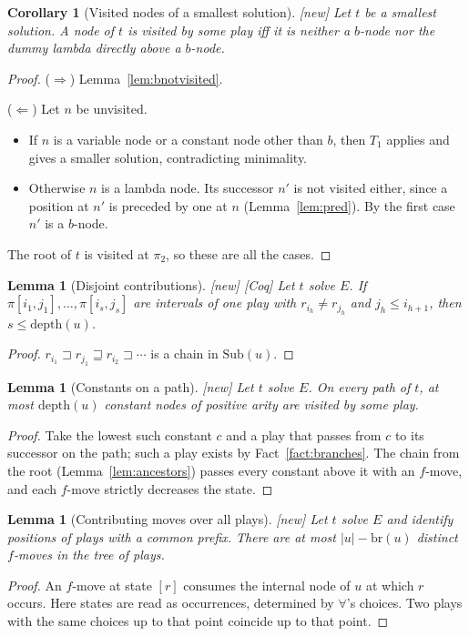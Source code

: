 \documentclass[11pt]{article}
\newcommand{\Sub}{\mathrm{Sub}}
\newcommand{\depth}{\mathrm{depth}}
\newcommand{\br}{\mathrm{br}}
\newcommand{\iv}[2]{\pi[#1,#2]}
\newcommand{\New}{\textsf{[new]}}
\newcommand{\Coq}{\textsf{[Coq]}}
\theoremstyle{plain}
\newtheorem{lemma}[theorem]{Lemma}
\newtheorem{corollary}[theorem]{Corollary}
\theoremstyle{definition}
\theoremstyle{remark}
\begin{document}
\begin{corollary}[Visited nodes of a smallest solution]\label{cor:visited}
\New{} Let $t$ be a smallest solution.  A node of $t$ is visited by
some play iff it is neither a $b$-node nor the dummy lambda directly
above a $b$-node.
\end{corollary}
\begin{proof}
($\Rightarrow$) Lemma~\ref{lem:bnotvisited}.

($\Leftarrow$) Let $n$ be unvisited.
\begin{itemize}
\item If $n$ is a variable node or a constant node other than $b$, then
  $T_1$ applies and gives a smaller solution, contradicting minimality.
\item Otherwise $n$ is a lambda node.  Its successor $n'$ is not visited
  either, since a position at $n'$ is preceded by one at $n$
  (Lemma~\ref{lem:pred}).  By the first case $n'$ is a $b$-node.
\end{itemize}
The root of $t$ is visited at $\pi_2$, so these are all the cases.
\end{proof}

\begin{lemma}[Disjoint contributions]\label{lem:disjoint}
\New{} \Coq{} Let $t$ solve $E$.  If
$\iv{i_1}{j_1},\dots,\iv{i_s}{j_s}$ are intervals of one play with
$r_{i_h}\ne r_{j_h}$ and $j_h\le i_{h+1}$, then $s\le\depth(u)$.
\end{lemma}
\begin{proof}
$r_{i_1}\sqsupset r_{j_1}\sqsupseteq r_{i_2}\sqsupset\cdots$ is a chain in
$\Sub(u)$.
\end{proof}

\begin{lemma}[Constants on a path]\label{lem:constants}
\New{} Let $t$ solve $E$.  On every path of $t$, at most $\depth(u)$
constant nodes of positive arity are visited by some play.
\end{lemma}
\begin{proof}
Take the lowest such constant $c$ and a play that passes from $c$ to its
successor on the path; such a play exists by Fact~\ref{fact:branches}.
The chain from the root (Lemma~\ref{lem:ancestors}) passes every
constant above it with an $f$-move, and each $f$-move strictly
decreases the state.
\end{proof}

\begin{lemma}[Contributing moves over all plays]\label{lem:global}
\New{} Let $t$ solve $E$ and identify positions of plays with a common
prefix.  There are at most $|u|-\br(u)$ distinct $f$-moves in the tree
of plays.
\end{lemma}
\begin{proof}
An $f$-move at state $[r]$ consumes the internal node of $u$ at which
$r$ occurs.  Here states are read as occurrences, determined by
$\forall$'s choices.  Two plays with the same choices up to that point
coincide up to that point.
\end{proof}
\end{document}
